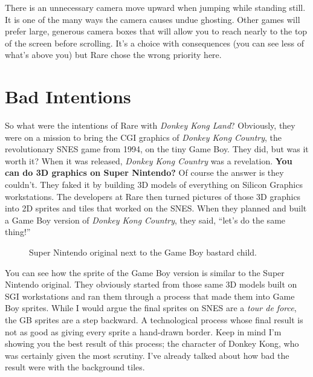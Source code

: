 \documentclass{book}
\begin{document}
There is an unnecessary camera move upward when jumping while standing still. It is one of the many ways the camera causes undue ghosting. Other games will prefer large, generous camera boxes that will allow you to reach nearly to the top of the screen before scrolling. It’s a choice with consequences (you can see less of what’s above you) but Rare chose the wrong priority here.\par
\FloatBarrier\section*{Bad Intentions}
So what were the intentions of Rare with \emph{Donkey Kong Land}? Obviously, they were on a mission to bring the CGI graphics of \emph{Donkey Kong Country}, the revolutionary SNES game from 1994, on the tiny Game Boy. They did, but was it worth it? When it was released, \emph{Donkey Kong Country} was a revelation. \textbf{You can do 3D graphics on Super Nintendo?} Of course the answer is they couldn’t. They faked it by building 3D models of everything on Silicon Graphics workstations. The developers at Rare then turned pictures of those 3D graphics into 2D sprites and tiles that worked on the SNES. When they planned and built a Game Boy version of \emph{Donkey Kong Country}, they said, “let’s do the same thing!”\par
\FloatBarrier\vspace{\baselineskip}\begin{figure}[H]\caption*{Super Nintendo original next to the Game Boy bastard child.}\end{figure}
You can see how the sprite of the Game Boy version is similar to the Super Nintendo original. They obviously started from those same 3D models built on SGI workstations and ran them through a process that made them into Game Boy sprites. While I would argue the final sprites on SNES are a \emph{tour de force}, the GB sprites are a step backward. A technological process whose final result is not as good as giving every sprite a hand-drawn border. Keep in mind I’m showing you the best result of this process; the character of Donkey Kong, who was certainly given the most scrutiny. I’ve already talked about how bad the result were with the background tiles.\par
\end{document}
